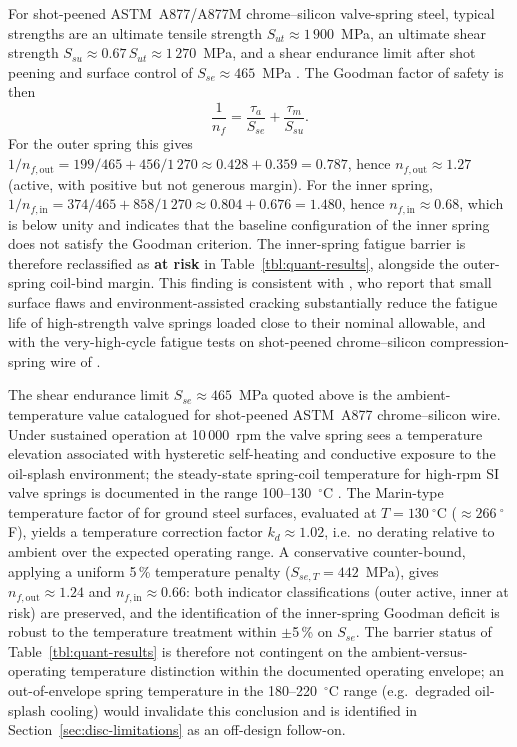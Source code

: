 For shot-peened ASTM~A877/A877M chrome--silicon valve-spring steel,
typical strengths are an ultimate tensile strength
$S_{ut}\approx 1\,900$~MPa, an ultimate shear strength
$S_{su}\approx 0.67\,S_{ut}\approx 1\,270$~MPa, and a shear endurance
limit after shot peening and surface control of
$S_{se}\approx 465$~MPa
\citep[\S~10-30]{shigley2020}. The Goodman factor of safety is then
\begin{equation}
\frac{1}{n_{f}}=\frac{\tau_{a}}{S_{se}}+\frac{\tau_{m}}{S_{su}}.
\label{eq:goodman}
\end{equation}
For the outer spring this gives
$1/n_{f,\mathrm{out}}=199/465+456/1\,270\approx 0.428+0.359=0.787$,
hence $n_{f,\mathrm{out}}\approx 1.27$ (active, with positive but
not generous margin). For the inner spring,
$1/n_{f,\mathrm{in}}=374/465+858/1\,270\approx 0.804+0.676=1.480$,
hence $n_{f,\mathrm{in}}\approx 0.68$, which is below unity and
indicates that the baseline configuration of the inner spring does
not satisfy the Goodman criterion. The inner-spring fatigue barrier
is therefore reclassified as \textbf{at risk} in
Table~\ref{tbl:quant-results}, alongside the outer-spring coil-bind
margin. This finding is consistent with
\citet{xing2021valvespringEAC,ko2022springfatigueflaws}, who report
that small surface flaws and environment-assisted cracking
substantially reduce the fatigue life of high-strength valve springs
loaded close to their nominal allowable, and with the very-high-cycle
fatigue tests on shot-peened chrome--silicon compression-spring wire
of \citet{berger2006vhcf,pyttel2014fatigue}.

The shear endurance limit $S_{se}\approx 465$~MPa quoted above is the
ambient-temperature value catalogued for shot-peened ASTM~A877
chrome--silicon wire. Under sustained operation at 10\,000~rpm the
valve spring sees a temperature elevation associated with hysteretic
self-heating and conductive exposure to the oil-splash environment;
the steady-state spring-coil temperature for high-rpm SI valve
springs is documented in the range 100--130~$^{\circ}$C
\citep{heisler2002}. The Marin-type temperature factor of
\citet[Eq.~7-19]{shigley2020} for ground steel surfaces, evaluated at
$T=130~^{\circ}$C ($\approx 266~^{\circ}$F), yields a temperature
correction factor $k_{d}\approx 1.02$, i.e.\ no derating relative to
ambient over the expected operating range. A conservative
counter-bound, applying a uniform 5\,\% temperature penalty
($S_{se,T}=442$~MPa), gives $n_{f,\mathrm{out}}\approx 1.24$ and
$n_{f,\mathrm{in}}\approx 0.66$: both indicator
classifications (outer active, inner at risk) are preserved, and the
identification of the inner-spring Goodman deficit is robust to the
temperature treatment within $\pm$5\,\% on $S_{se}$. The barrier
status of Table~\ref{tbl:quant-results} is therefore not contingent
on the ambient-versus-operating temperature distinction within the
documented operating envelope; an out-of-envelope spring temperature
in the 180--220~$^{\circ}$C range (e.g.\ degraded oil-splash cooling)
would invalidate this conclusion and is identified in
Section~\ref{sec:disc-limitations} as an off-design follow-on.

